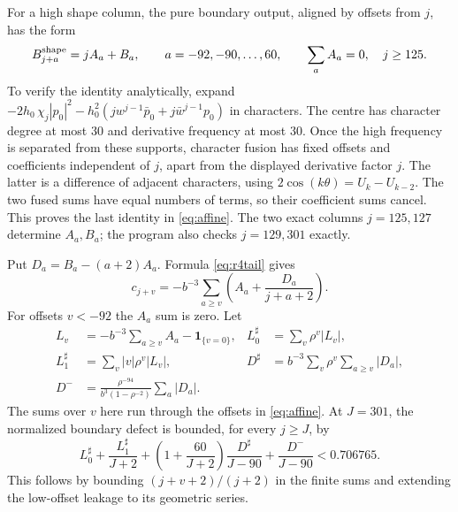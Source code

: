 \documentclass[11pt]{amsart}
\theoremstyle{remark}
\numberwithin{equation}{section}
\begin{document}
For a high shape column, the pure boundary output, aligned by offsets
from $j$, has the form
\begin{equation}\label{eq:affine}
 B^{\rm shape}_{j+a}=jA_a+B_a,\qquad
 a=-92,-90,\ldots,60,\qquad \sum_aA_a=0,\quad j\ge125.
\end{equation}
To verify the identity analytically, expand
$-2h_0\,\chi_j|p_0|^2-h_0^2
(jw^{j-1}\bar p_0+j\bar w^{j-1}p_0)$ in characters.
The centre has character degree at most $30$ and derivative frequency
at most $30$. Once the high frequency is separated from these supports,
character fusion has fixed offsets and coefficients independent of $j$,
apart from the displayed derivative factor $j$. The latter is a
difference of adjacent characters, using
$2\cos(k\theta)=U_k-U_{k-2}$. The two fused sums have equal numbers of
terms, so their coefficient sums cancel. This proves the last identity
in \eqref{eq:affine}. The two exact columns $j=125,127$ determine
$A_a,B_a$; the program also checks $j=129,301$ exactly.

Put $D_a=B_a-(a+2)A_a$. Formula \eqref{eq:r4tail} gives
\[
 c_{j+v}=-b^{-3}\sum_{a\ge v}
       \left(A_a+\frac{D_a}{j+a+2}\right).
\]
For offsets $v<-92$ the $A_a$ sum is zero. Let
\begin{align*}
 L_v&=-b^{-3}\sum_{a\ge v}A_a-\mathbf1_{\{v=0\}},&
 L_0^\sharp&=\sum_v\rho^v|L_v|,\\
 L_1^\sharp&=\sum_v|v|\rho^v|L_v|,&
 D^\sharp&=b^{-3}\sum_v\rho^v\sum_{a\ge v}|D_a|,\\
 D^-&=\frac{\rho^{-94}}{b^3(1-\rho^{-2})}\sum_a|D_a|.
\end{align*}
The sums over $v$ here run through the offsets in \eqref{eq:affine}.
At $J=301$, the normalized boundary defect is bounded, for every
$j\ge J$, by
\begin{equation}\label{eq:r4boundaryfar}
 L_0^\sharp+\frac{L_1^\sharp}{J+2}
 +\left(1+\frac{60}{J+2}\right)\frac{D^\sharp}{J-90}
 +\frac{D^-}{J-90}<0.706765.
\end{equation}
This follows by bounding $(j+v+2)/(j+2)$ in the finite sums and extending
the low-offset leakage to its geometric series.
\end{document}
